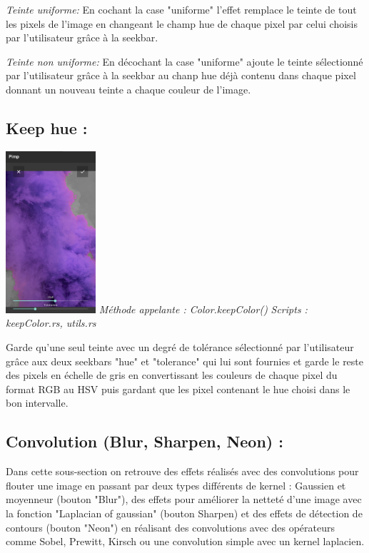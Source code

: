     \emph{Teinte uniforme:}
        En cochant la case "uniforme" l'effet remplace le teinte de tout les pixels de l'image en changeant le champ hue de chaque pixel par celui choisis par l'utilisateur grâce à la seekbar.
        

    \emph{Teinte non uniforme:}
        En décochant la case "uniforme" ajoute le teinte sélectionné par l'utilisateur grâce à la seekbar au chanp hue déjà contenu dans chaque pixel donnant un nouveau 
        teinte a chaque couleur de l'image.
        


\subsection{Keep hue :}

\includegraphics[width=0.25\textwidth]{report_src/effects/keepColor.png}
\newline
\emph{Méthode appelante : Color.keepColor()}
\emph{Scripts : keepColor.rs, utils.rs} 
\newline

Garde qu'une seul teinte avec un degré de tolérance sélectionné par l'utilisateur grâce aux deux seekbars "hue"  et "tolerance" qui lui sont fournies et garde 
le reste des pixels en échelle de gris en convertissant les couleurs de chaque pixel du format RGB au HSV puis gardant que les pixel contenant le hue choisi dans le bon intervalle.
\\

\subsection{Convolution (Blur, Sharpen, Neon) :} \label{convolution}

    Dans cette sous-section on retrouve des effets réalisés avec des convolutions pour flouter une image en passant par deux types différents de kernel : Gaussien et moyenneur
    (bouton "Blur"), des effets pour améliorer la netteté d'une image avec la fonction "Laplacian of gaussian" (bouton Sharpen) et des effets de 
    détection de contours (bouton "Neon") en réalisant des convolutions avec des opérateurs comme Sobel, Prewitt, Kirsch ou une convolution simple avec un kernel
    laplacien.
    \\

